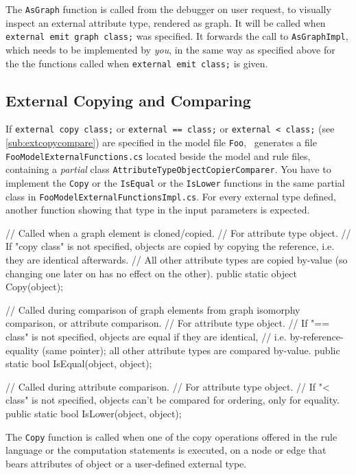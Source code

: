 The \texttt{AsGraph} function is called from the debugger on user request, to visually inspect an external attribute type, rendered as graph.
It will be called when \texttt{external emit graph class;} was specified.
It forwards the call to \texttt{AsGraphImpl}, which needs to be implemented by \emph{you}, in the same way as specified above for the the functions called when \texttt{external emit class;} is given.

\subsection*{External Copying and Comparing}\label{sub:apiextcopycompare}

If \texttt{external copy class;} or \texttt{external == class;} or \texttt{external < class;} (see \ref{sub:extcopycompare}) are specified in the model file \texttt{Foo},
\GrG~generates a file \texttt{Foo\-Model\-External\-Functions.cs} located beside the model and rule files,
containing a \emph{partial} class \texttt{Attribute\-Type\-Object\-Copier\-Comparer}.
You have to implement the \texttt{Copy} or the \texttt{IsEqual} or the \texttt{IsLower} functions in the same partial class in \texttt{Foo\-Model\-External\-Functions\-Impl.cs}.
For every external type defined, another function showing that type in the input parameters is expected.

\begin{csharplet}
// Called when a graph element is cloned/copied.
// For attribute type object.
// If "copy class" is not specified, objects are copied by copying the reference, i.e. they are identical afterwards.
// All other attribute types are copied by-value (so changing one later on has no effect on the other).
public static object Copy(object);

// Called during comparison of graph elements from graph isomorphy comparison, or attribute comparison.
// For attribute type object.
// If "== class" is not specified, objects are equal if they are identical,
// i.e. by-reference-equality (same pointer); all other attribute types are compared by-value.
public static bool IsEqual(object, object);

// Called during attribute comparison.
// For attribute type object.
// If "< class" is not specified, objects can't be compared for ordering, only for equality.
public static bool IsLower(object, object);
\end{csharplet}

The \texttt{Copy} function is called when one of the copy operations offered in the rule language or the computation statements is executed, on a node or edge that bears attributes of object or a user-defined external type.

